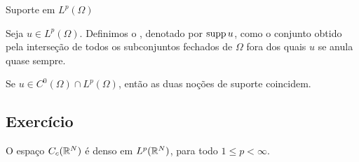 \begin{frame}{Suporte em $L^p(\Omega)$}
	\begin{defin}
Seja $u\in L^p(\Omega)$. Definimos o , denotado por {\color{blue}$\operatorname{supp} u$}, como o conjunto obtido pela interseção de todos os subconjuntos fechados de $\Omega$ fora dos quais {\color{blue}$u$} se anula quase sempre.
	\end{defin}

\begin{exer}
Se $u\in C^0(\Omega)\cap L^p(\Omega)$, então as duas noções de suporte coincidem. 
\subsection*{Exercício \theexer}
\end{exer}

\begin{prop}
	O espaço $C_c(\mathbb{R}^N)$ é denso em $L^p(\mathbb{R}^N)$, para todo $1\leq p<\infty$.
\end{prop}
\end{frame}



